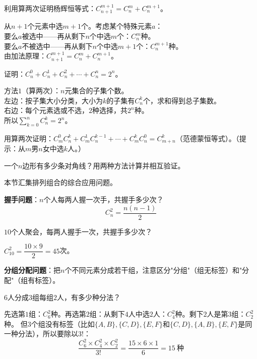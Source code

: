 \begin{example}
利用算两次证明杨辉恒等式：$C_{n+1}^{m+1} = C_n^m + C_n^{m+1}$。
\end{example}
\begin{solution}
从$n+1$个元素中选$m+1$个。考虑某个特殊元素$a$：\\
要么$a$被选中——再从剩下$n$个中选$m$个：$C_n^m$种。\\
要么$a$不被选中——再从剩下$n$个中选$m+1$个：$C_n^{m+1}$种。\\
由加法原理：$C_{n+1}^{m+1} = C_n^m + C_n^{m+1}$。
\end{solution}

\begin{example}
证明：$C_n^0 + C_n^1 + C_n^2 + \cdots + C_n^n = 2^n$。
\end{example}
\begin{solution}
方法$1$（算两次）：$n$元集合的子集个数。\\
左边：按子集大小分类，大小为$k$的子集有$C_n^k$个，求和得到总子集数。\\
右边：每个元素选或不选，$2$种选择，共$2^n$种。\\
所以$\sum_{k=0}^n C_n^k = 2^n$。
\end{solution}

\begin{exercise}
\item 用算两次证明：$C_m^0C_n^k + C_m^1C_n^{k-1} + \cdots + C_m^kC_n^0 = C_{m+n}^k$（范德蒙恒等式）。（提示：从$m$男$n$女中选$k$人。）
\item 一个$n$边形有多少条对角线？用两种方法计算并相互验证。
\end{exercise}


本节汇集排列组合的综合应用问题。

\textbf{握手问题}：$n$个人每两人握一次手，共握手多少次？
\[
C_n^2 = \frac{n(n-1)}{2}
\]

\begin{example}
$10$个人聚会，每两人握手一次，共握手多少次？
\end{example}
\begin{solution}
$C_{10}^2 = \dfrac{10\times9}{2} = 45$次。
\end{solution}

\textbf{分组分配问题}：把$n$个不同元素分成若干组，注意区分"分组"（组无标签）和"分配"（组有标签）。

\begin{example}
$6$人分成$3$组每组$2$人，有多少种分法？
\end{example}
\begin{solution}
先选第$1$组：$C_6^2$种。再选第$2$组：从剩下$4$人中选$2$人：$C_4^2$种。剩下$2$人是第$3$组：$C_2^2$种。
但$3$个组没有标签（比如$\{A,B\},\{C,D\},\{E,F\}$和$\{C,D\},\{A,B\},\{E,F\}$是同一种分法），所以要除以$3!$：
\[
\frac{C_6^2 \times C_4^2 \times C_2^2}{3!} = \frac{15\times6\times1}{6} = 15\ \text{种}
\]
\end{solution}

